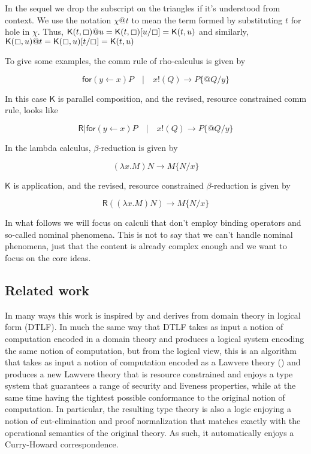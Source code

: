\documentclass{llncs}
\renewcommand{\:}{\colon}
\begin{document}
In the sequel we drop the subscript on the triangles if it's understood from
context. We use the notation $\chi @ t$ to mean the term formed by
substituting $t$ for hole in $\chi$. Thus, $\mathsf{K}(t, \boxempty)@u = \mathsf{K}(t, \boxempty)[u/\boxempty] = \mathsf{K}(t,u)$ and similarly, $\mathsf{K}(\boxempty, u)@t = \mathsf{K}(\boxempty, u)[t/\boxempty] = \mathsf{K}(t,u)$

To give some examples, the comm rule of rho-calculus is given by

\begin{equation*}
  \mathsf{for}( y \leftarrow x )P \quad | \quad x\mathsf{!}(Q) \rightarrow P\{ @Q/y \}
\end{equation*}

In this case $\mathsf{K}$ is parallel composition, and the revised, resource
constrained comm rule, looks like

\begin{equation*}
  \mathsf{R} | \mathsf{for}( y \leftarrow x )P \quad | \quad x\mathsf{!}(Q) \rightarrow P\{ @Q/y \}
\end{equation*}

In the lambda calculus, $\beta$-reduction is given by

\begin{equation*}
  (\lambda x.M)N \rightarrow M\{ N/x \}
\end{equation*}  

$\mathsf{K}$ is application, and the revised, resource constrained $\beta$-reduction is given by

\begin{equation*}
  \mathsf{R}((\lambda x.M)N) \rightarrow M\{ N/x \}
\end{equation*}    

In what follows we will focus on calculi that don't employ binding
operators and so-called nominal phenomena. This is not to say that we
can't handle nominal phenomena, just that the content is already
complex enough and we want to focus on the core ideas.


\subsection{Related work}
In many ways this work is inspired by and derives from domain theory
in logical form (DTLF).\cite{DBLP:journals/apal/Abramsky91} In much
the same way that DTLF takes as input a notion of computation encoded
in a domain theory and produces a logical system encoding the same
notion of computation, but from the logical view, this is an algorithm
that takes as input a notion of computation encoded as a Lawvere
theory (\cite{DBLP:journals/entcs/HylandP07}) and produces a new
Lawvere theory that is resource constrained and enjoys a type system
that guarantees a range of security and liveness properties, while at
the same time having the tightest possible conformance to the original
notion of computation. In particular, the resulting type theory is
also a logic enjoying a notion of cut-elimination and proof
normalization that matches exactly with the operational semantics of
the original theory. As such, it automatically enjoys a Curry-Howard
correspondence.
\end{document}
